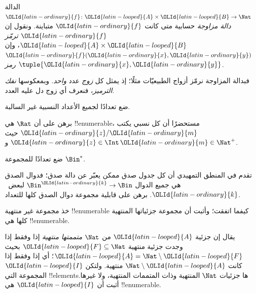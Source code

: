\documentclass[../../../include/open-logic-section]{subfiles}
\begin{document}
\begin{defn}
الدالة ${\OLId{latin-ordinary}{f}}\colon {\OLId{latin-looped}{A}} \times {\OLId{latin-looped}{B}} \to \Nat$ \emph{دالة مزاوجة} حسابية
متى كانت ${\OLId{latin-ordinary}{f}}$ متباينة. ونقول إن ${\OLId{latin-ordinary}{f}}$ \emph{ترمّز} ${\OLId{latin-looped}{A}} \times {\OLId{latin-looped}{B}}$،
وإن ${\OLId{latin-ordinary}{f}}({\OLId{latin-ordinary}{x}},{\OLId{latin-ordinary}{y}})$ \emph{رمز} $\tuple{{\OLId{latin-ordinary}{x}},{\OLId{latin-ordinary}{y}}}$.
\end{defn}

\begin{explain}
فبدالة المزاوجة نرمّز أزواج الطبيعيّات مثلًا؛ إذ يمثل كل
\emph{زوج} عدد \emph{واحد}. وبمعكوسها \emph{نفك الترميز}،
فنعرف أي زوج دل عليه العدد.
\end{explain}

\begin{prob}
ضع تعدادًا لجميع الأعداد النسبية غير السالبة.
\end{prob}

\begin{prob}
برهن على أن $\Rat$ هي !!{enumerable}، مستحضرًا أن كل نسبي
يكتب ${\OLId{latin-ordinary}{z}}/{\OLId{latin-ordinary}{m}}$ حيث ${\OLId{latin-ordinary}{z}} \in \Int$ و${\OLId{latin-ordinary}{m}} \in \Nat^+$.
\end{prob}

\begin{prob}
ضع تعدادًا للمجموعة $\Bin^*$.
\end{prob}

\begin{prob}
تقدم في المنطق التمهيدي أن كل جدول صدق ممكن يعبّر عن دالة صدق؛
فدوال الصدق هي جميع الدوال $\Bin^{\OLId{latin-ordinary}{k}} \to \Bin$ لبعض~${\OLId{latin-ordinary}{k}}$.
برهن على قابلية مجموعة دوال الصدق كلها للتعداد.
\end{prob}

\begin{prob}
خذ مجموعة غير منتهية !!{enumerable} كيفما اتفقت؛ وأثبت أن مجموعة
جزئياتها المنتهية كلها هي !!{enumerable}.
\end{prob}

\begin{prob}
يقال إن جزئية ${\OLId{latin-looped}{A}}$ من $\Nat$ \emph{متممتها منتهية} إذا وفقط إذا وجدت
جزئية منتهية ${\OLId{latin-looped}{F}}\subseteq\Nat$ بحيث ${\OLId{latin-looped}{A}}=\Nat\setminus {\OLId{latin-looped}{F}}$؛ أي إذا وفقط إذا
كانت $\Nat\setminus {\OLId{latin-looped}{A}}$ منتهية. ولتكن ${\OLId{latin-looped}{I}}$ المجموعة التي !!{element}sها
جزئيات $\Nat$ المنتهية وذات المتممات المنتهية، ولا غيرها. أثبت أن ${\OLId{latin-looped}{I}}$
هي !!{enumerable}.
\end{prob}
\end{document}
